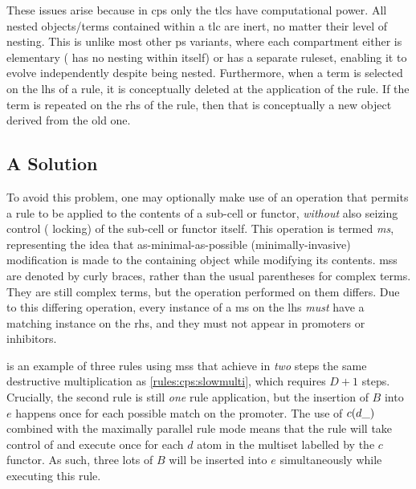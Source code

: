 These issues arise because in \gls{cps} only the \glspl{tlc} have computational power.  All nested objects/terms contained within a \gls{tlc} are inert, no matter their level of nesting.  This is unlike most other \gls{ps} variants, where each compartment either is elementary (\ie{} has no nesting within itself) or has a separate ruleset, enabling it to evolve independently despite being nested.  Furthermore, when a term is selected on the \gls{lhs} of a rule, it is conceptually deleted at the application of the rule.  If the term is repeated on the \gls{rhs} of the rule, then that is conceptually a new object derived from the old one.

\subsection{A Solution}
To avoid this problem, one may optionally make use of an operation that permits a rule to be applied to the contents of a sub-cell or functor, \emph{without} also seizing control (\ie{} locking) of the sub-cell or functor itself.  This operation is termed \emph{\gls{ms}}, representing the idea that as-minimal-as-possible (minimally-invasive) modification is made to the containing object while modifying its contents.  \Glspl{ms} are denoted by curly braces, rather than the usual parentheses for complex terms.  They are still complex terms, but the operation performed on them differs.  Due to this differing operation, every instance of a \gls{ms} on the \gls{lhs} \emph{must} have a matching instance on the \gls{rhs}, and they must not appear in promoters or inhibitors.

\begin{cprulesetfloat}
    \begin{cpruleset}

    \end{cpruleset}
    \caption{\label{rules:cps:microsurg}Rules for a destructive multiplication process that requires exactly two steps regardless of the numbers multiplied by using \gls{cps} \glspl{ms}}
\end{cprulesetfloat}

 is an example of three rules using \glspl{ms} that achieve in \emph{two} steps the same destructive multiplication as \cref{rules:cps:slowmulti}, which requires \(D + 1\) steps.  Crucially, the second rule is still \emph{one} rule application, but the insertion of \(B\) into \(e\) happens once for each possible match on the promoter.  The use of \(c(d\_)\) combined with the maximally parallel rule mode means that the rule will take control of and execute once for each \(d\) atom in the multiset labelled by the \(c\) functor.  As such, three lots of \(B\) will be inserted into \(e\) simultaneously while executing this rule.

